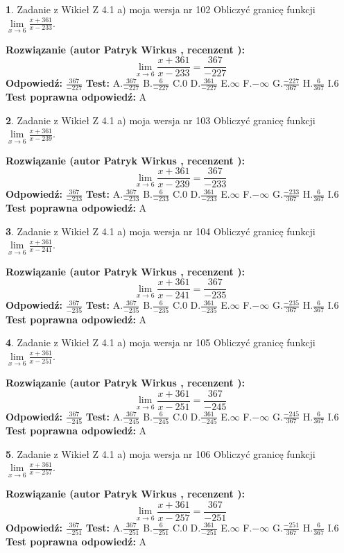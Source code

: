 \documentclass[12pt, a4paper]{article}
\theoremstyle{definition} %
\newtheorem{zad}{}
\newcommand{\zadStart}[1]{\begin{zad}#1\newline}
\newcommand{\zadStop}{\end{zad}}
\newcommand{\rozwStart}[2]{\noindent \textbf{Rozwiązanie (autor #1 , recenzent #2): }\newline}
\newcommand{\rozwStop}{\newline}
\newcommand{\odpStart}{\noindent \textbf{Odpowiedź:}\newline}
\newcommand{\odpStop}{\newline}
\newcommand{\testStart}{\noindent \textbf{Test:}\newline}
\newcommand{\testStop}{\newline}
\newcommand{\kluczStart}{\noindent \textbf{Test poprawna odpowiedź:}\newline}
\newcommand{\kluczStop}{\newline}
\begin{document}
\zadStart{Zadanie z Wikieł Z 4.1 a) moja wersja nr 102}
Obliczyć granicę funkcji $\lim\limits_{x\to6}\frac{x+361}{x-233}$.
\zadStop
\rozwStart{Patryk Wirkus}{}
$$\lim\limits_{x\to6}\frac{x+361}{x-233} = \frac{367}{-227}$$
\rozwStop
\odpStart
$\frac{367}{-227}$
\odpStop
\testStart
A.$\frac{367}{-227}$
B.$\frac{6}{-227}$
C.$0$
D.$\frac{361}{-227}$
E.$\infty$
F.$-\infty$
G.$\frac{-227}{367}$
H.$\frac{6}{367}$
I.$6$
\testStop
\kluczStart
A
\kluczStop



\zadStart{Zadanie z Wikieł Z 4.1 a) moja wersja nr 103}
Obliczyć granicę funkcji $\lim\limits_{x\to6}\frac{x+361}{x-239}$.
\zadStop
\rozwStart{Patryk Wirkus}{}
$$\lim\limits_{x\to6}\frac{x+361}{x-239} = \frac{367}{-233}$$
\rozwStop
\odpStart
$\frac{367}{-233}$
\odpStop
\testStart
A.$\frac{367}{-233}$
B.$\frac{6}{-233}$
C.$0$
D.$\frac{361}{-233}$
E.$\infty$
F.$-\infty$
G.$\frac{-233}{367}$
H.$\frac{6}{367}$
I.$6$
\testStop
\kluczStart
A
\kluczStop



\zadStart{Zadanie z Wikieł Z 4.1 a) moja wersja nr 104}
Obliczyć granicę funkcji $\lim\limits_{x\to6}\frac{x+361}{x-241}$.
\zadStop
\rozwStart{Patryk Wirkus}{}
$$\lim\limits_{x\to6}\frac{x+361}{x-241} = \frac{367}{-235}$$
\rozwStop
\odpStart
$\frac{367}{-235}$
\odpStop
\testStart
A.$\frac{367}{-235}$
B.$\frac{6}{-235}$
C.$0$
D.$\frac{361}{-235}$
E.$\infty$
F.$-\infty$
G.$\frac{-235}{367}$
H.$\frac{6}{367}$
I.$6$
\testStop
\kluczStart
A
\kluczStop



\zadStart{Zadanie z Wikieł Z 4.1 a) moja wersja nr 105}
Obliczyć granicę funkcji $\lim\limits_{x\to6}\frac{x+361}{x-251}$.
\zadStop
\rozwStart{Patryk Wirkus}{}
$$\lim\limits_{x\to6}\frac{x+361}{x-251} = \frac{367}{-245}$$
\rozwStop
\odpStart
$\frac{367}{-245}$
\odpStop
\testStart
A.$\frac{367}{-245}$
B.$\frac{6}{-245}$
C.$0$
D.$\frac{361}{-245}$
E.$\infty$
F.$-\infty$
G.$\frac{-245}{367}$
H.$\frac{6}{367}$
I.$6$
\testStop
\kluczStart
A
\kluczStop



\zadStart{Zadanie z Wikieł Z 4.1 a) moja wersja nr 106}
Obliczyć granicę funkcji $\lim\limits_{x\to6}\frac{x+361}{x-257}$.
\zadStop
\rozwStart{Patryk Wirkus}{}
$$\lim\limits_{x\to6}\frac{x+361}{x-257} = \frac{367}{-251}$$
\rozwStop
\odpStart
$\frac{367}{-251}$
\odpStop
\testStart
A.$\frac{367}{-251}$
B.$\frac{6}{-251}$
C.$0$
D.$\frac{361}{-251}$
E.$\infty$
F.$-\infty$
G.$\frac{-251}{367}$
H.$\frac{6}{367}$
I.$6$
\testStop
\kluczStart
A
\kluczStop
\end{document}
